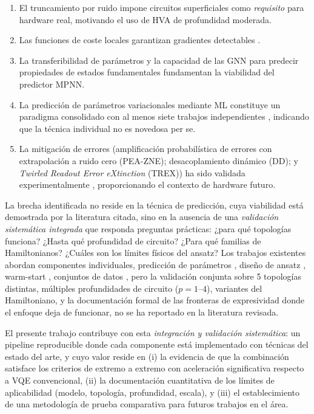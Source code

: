 \documentclass[11pt,a4paper,spanish]{book}
\begin{document}
\begin{enumerate}
    \item El truncamiento por ruido \citep{mele2026} impone circuitos superficiales como \emph{requisito} para hardware real, motivando el uso de HVA de profundidad moderada.
    \item Las funciones de coste locales garantizan gradientes detectables \citep{cerezo2021}.
    \item La transferibilidad de parámetros \citep{mele2022, puig2025} y la capacidad de las GNN para predecir propiedades de estados fundamentales \citep{huang2022, zhang2025} fundamentan la viabilidad del predictor MPNN.
    \item La predicción de parámetros variacionales mediante ML constituye un paradigma consolidado con al menos siete trabajos independientes \citep{miao2024, zhang2025, zou2026, yang2024pvls, zhang2025vqezy, huang2025palqo, karim2025}, indicando que la técnica individual no es novedosa per se.
    \item La mitigación de errores (amplificación probabilística de errores con extrapolación a ruido cero (PEA-ZNE); desacoplamiento dinámico (DD); y \emph{Twirled Readout Error eXtinction} (TREX)) ha sido validada experimentalmente \citep{kim2023, ma2025}, proporcionando el contexto de hardware futuro.
\end{enumerate}

La brecha identificada no reside en la técnica de predicción, cuya viabilidad está demostrada por la literatura citada, sino en la ausencia de una \emph{validación sistemática integrada} que responda preguntas prácticas: ¿para qué topologías funciona? ¿Hasta qué profundidad de circuito? ¿Para qué familias de Hamiltonianos? ¿Cuáles son los límites físicos del ansatz? Los trabajos existentes abordan componentes individuales, predicción de parámetros \citep{miao2024, zhang2025, huang2025palqo}, diseño de ansatz \citep{wiersema2020, tripathi2026}, warm-start \citep{puig2025}, conjuntos de datos \citep{zhang2025vqezy}, pero la validación conjunta sobre 5 topologías distintas, múltiples profundidades de circuito ($p = 1$--$4$), variantes del Hamiltoniano, y la documentación formal de las fronteras de expresividad donde el enfoque deja de funcionar, no se ha reportado en la literatura revisada.

El presente trabajo contribuye con esta \emph{integración y validación sistemática}: un pipeline reproducible donde cada componente está implementado con técnicas del estado del arte, y cuyo valor reside en (i) la evidencia de que la combinación satisface los criterios de extremo a extremo con aceleración significativa respecto a VQE convencional, (ii) la documentación cuantitativa de los límites de aplicabilidad (modelo, topología, profundidad, escala), y (iii) el establecimiento de una metodología de prueba comparativa para futuros trabajos en el área.
\end{document}
